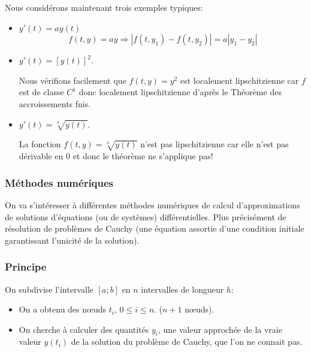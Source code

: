 \documentclass{beamer}
\begin{document}
  \begin{frame} 
Nous considérons maintenant trois exemples typiques:
\begin{itemize}
\item $y'(t) = a y(t)$
 \[f(t,y) = a y \Longrightarrow |f(t, y_1) - f(t, y_2)|=a|y_1 - y_2|\]
\item $y'(t) = \left[y(t)\right]^2$. 

Nous vérifions facilement que $f(t,y) = y^2$ est localement lipschitzienne car $f$ est de classe $C^1$ donc localement lipschitzienne d'après  le Théorème des accroissements
fnis.
\item $y'(t) = \sqrt[3]{y(t)}$. 

La fonction  $f(t,y)=\sqrt[3]{y(t)}$ n'est pas lipschitzienne car elle n'est pas dérivable en $0$ et donc le théorème ne s'applique pas!
\end{itemize}  
 
    \end{frame} 
\begin{frame}   
\frametitle{Méthodes numériques} 
   On va s'intéresser à différentes méthodes numériques de calcul d'approximations de solutions d'équations (ou de systèmes) différentielles. Plus précisément de résolution de problèmes de Cauchy (une équation assortie d'une condition initiale garantissant
l'unicité de la solution). 
 \end{frame}   
\begin{frame}   
\frametitle{Principe} 
   On subdivise l'intervalle $[a; b]$ en $n$ intervalles de longueur $h$:
   \begin{center}
 \end{center}
 \begin{itemize}
\item On a obtenu des nœuds $t_i$, $0\leq i\leq n$. ($n + 1$ nœuds).
\item On cherche à calculer des quantités $y_i$, une valeur approchée
de la vraie valeur $y(t_i)$ de la solution du problème de Cauchy,
que l'on ne connait pas.
 \end{itemize}
 
 \end{frame}   
\end{document}
